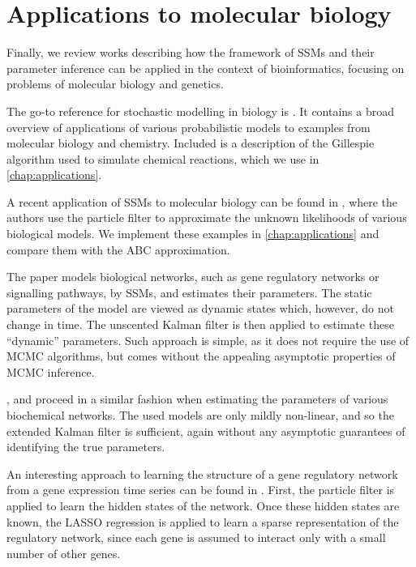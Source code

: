 \section{Applications to molecular biology}
Finally, we review works describing how the framework of SSMs and their parameter inference can be applied in the context of bioinformatics, focusing on problems of molecular biology and genetics.

The go-to reference for stochastic modelling in biology is \cite{wilkinson-book}. It contains a broad overview of applications of various probabilistic models to examples from molecular biology and chemistry. Included is a description of the Gillespie algorithm \cite{gillespie1, gillespie2} used to simulate chemical reactions, which we use in \autoref{chap:applications}.

A recent application of SSMs to molecular biology can be found in \cite{wilkinson}, where the authors use the particle filter to approximate the unknown likelihoods of various biological models. We implement these examples in \autoref{chap:applications} and compare them with the ABC approximation.

The paper \cite{bio1} models biological networks, such as gene regulatory networks or signalling pathways, by SSMs, and estimates their parameters. The static parameters of the model are viewed as dynamic states which, however, do not change in time. The unscented Kalman filter is then applied to estimate these ``dynamic'' parameters. Such approach is simple, as it does not require the use of MCMC algorithms, but comes without the appealing asymptotic properties of MCMC inference.

\cite{bio2}, \cite{bio3} and \cite{bio4} proceed in a similar fashion when estimating the parameters of various biochemical networks. The used models are only mildly non-linear, and so the extended Kalman filter is sufficient, again without any asymptotic guarantees of identifying the true parameters.

An interesting approach to learning the structure of a gene regulatory network from a gene expression time series can be found in \cite{bio5}. First, the particle filter is applied to learn the hidden states of the network. Once these hidden states are known, the LASSO regression is applied to learn a sparse representation of the regulatory network, since each gene is assumed to interact only with a small number of other genes.